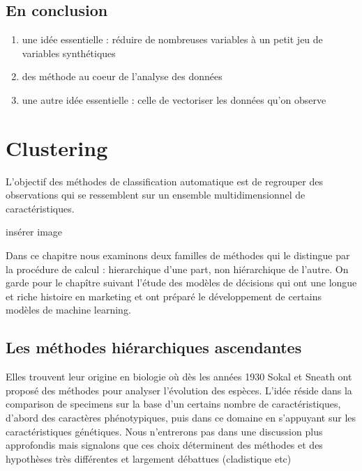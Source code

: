 \documentclass[
]{book}
\begin{document}
\hypertarget{en-conclusion}{%
\section{En conclusion}\label{en-conclusion}}

\begin{enumerate}
\def\labelenumi{\arabic{enumi})}
\item
  une idée essentielle : réduire de nombreuses variables à un petit jeu de variables synthétiques
\item
  des méthode au coeur de l'analyse des données
\item
  une autre idée essentielle : celle de vectoriser les données qu'on observe
\end{enumerate}

\hypertarget{clus}{%
\chapter{Clustering}\label{clus}}

L'objectif des méthodes de classification automatique est de regrouper des observations qui se ressemblent sur un ensemble multidimensionnel de caractéristiques.

insérer image

Dans ce chapitre nous examinons deux familles de méthodes qui le distingue par la procédure de calcul : hierarchique d'une part, non hiérarchique de l'autre. On garde pour le chapître suivant l'étude des modèles de décisions qui ont une longue et riche histoire en marketing et ont préparé le développement de certains modèles de machine learning.

\hypertarget{les-muxe9thodes-hiuxe9rarchiques-ascendantes}{%
\section{Les méthodes hiérarchiques ascendantes}\label{les-muxe9thodes-hiuxe9rarchiques-ascendantes}}

Elles trouvent leur origine en biologie où dès les années 1930 Sokal et Sneath\citep{sneath_numerical_1973} ont proposé des méthodes pour analyser l'évolution des espèces. L'idée réside dans la comparison de specimens sur la base d'un certains nombre de caractéristiques, d'abord des caractères phénotypiques, puis dans ce domaine en s'appuyant sur les caractéristiques génétiques. Nous n'entrerons pas dans une discussion plus approfondis mais signalons que ces choix déterminent des méthodes et des hypothèses très différentes et largement débattues (cladistique etc)
\end{document}
